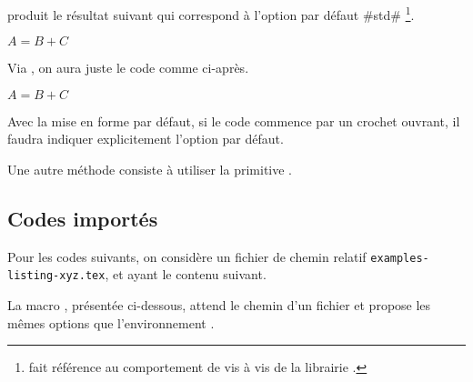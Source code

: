 

\begin{tdocexa}[À la suite]
     produit le résultat suivant qui correspond à l'option par défaut \tdocinlatex#std#
    \footnote{
         fait référence au comportement  de  vis à vis de la librairie .
    }.

    \begin{tdoclatex}
        $A = B + C$
    \end{tdoclatex}
\end{tdocexa}




\begin{tdocexa}
    Via , on aura juste le code comme ci-après.

    \begin{tdoclatex}[code]
        $A = B + C$
    \end{tdoclatex}
\end{tdocexa}




\begin{tdocwarn}
    Avec la mise en forme par défaut, si le code commence par un crochet ouvrant, il faudra indiquer explicitement l'option par défaut.


    \smallskip

    Une autre méthode consiste à utiliser la primitive .

\end{tdocwarn}


\subsection{Codes importés}

Pour les codes suivants, on considère un fichier de chemin relatif \verb+examples-listing-xyz.tex+, et ayant le contenu suivant.



\medskip

La macro , présentée ci-dessous, attend le chemin d'un fichier et propose les mêmes options que l'environnement .


